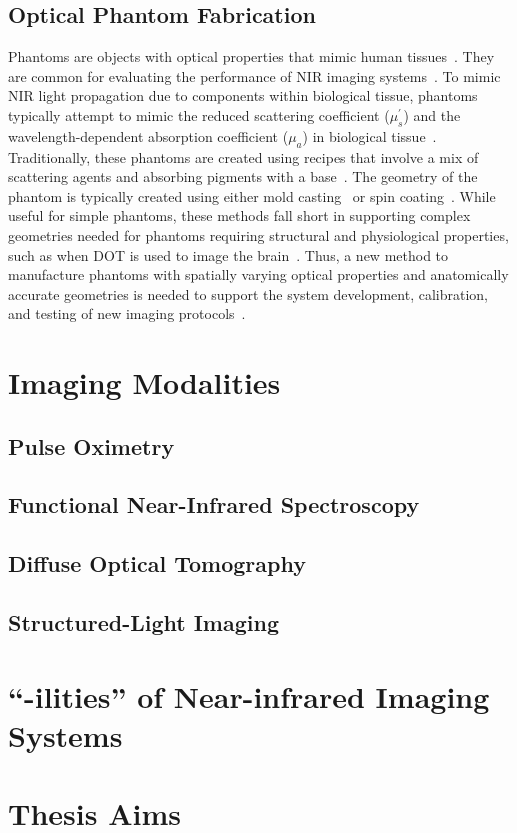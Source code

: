 \subsection{Optical Phantom Fabrication}
Phantoms are objects with optical properties that mimic human tissues~\cite{Pogue2006}. They are common for evaluating the performance of \ac{NIR} imaging systems~\cite{Pogue2006}. To mimic \ac{NIR} light propagation due to components within biological tissue, phantoms typically attempt to mimic the reduced scattering coefficient ($\mu_s^{'}$) and the wavelength-dependent absorption coefficient ($\mu_a$) in biological tissue~\cite{Dempsey2017}. Traditionally, these phantoms are created using recipes that involve a mix of scattering agents and absorbing pigments with a base~\cite{Hebden1995,Dong2015}. The geometry of the phantom is typically created using either mold casting~\cite{Hahn2012,Mobashsher2014} or spin coating~\cite{Park2013}. While useful for simple phantoms, these methods fall short in supporting complex geometries needed for phantoms requiring structural and physiological properties, such as when DOT is used to image the brain~\cite{Hebden2002,Villringer1997}. Thus, a new method to manufacture phantoms with spatially varying optical properties and anatomically accurate geometries is needed to support the system development, calibration, and testing of new imaging protocols~\cite{Cerussi2012,Diep2015}.  


\section{Imaging Modalities}
\label{chap:background:modalities}
\subsection{Pulse Oximetry}
\subsection{Functional Near-Infrared Spectroscopy}
\subsection{Diffuse Optical Tomography}
\subsection{Structured-Light Imaging}



\section{``-ilities'' of Near-infrared Imaging Systems}
\label{chap:background:ilities}



\section{Thesis Aims}
\label{chap:background:aims}


